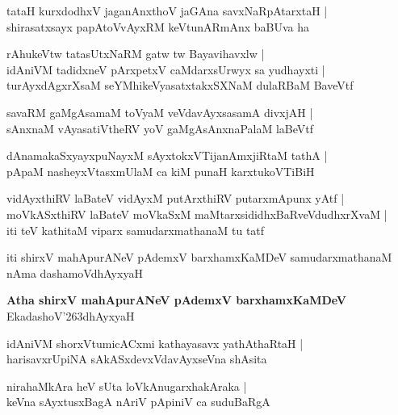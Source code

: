 \begin{shloka}
tataH kurxdodhxV jaganAnxthoV jaGAna savxNaRpAtarxtaH |\\
shirasatxsayx papAtoVvAyxRM keVtunARmAnx baBUva ha
\end{shloka}

\begin{shloka}
rAhukeVtw tatasUtxNaRM gatw tw Bayavihavxlw |\\
idAniVM tadidxneV pArxpetxV caMdarxsUrwyx sa yudhayxti |\\
turAyxdAgxrXsaM seYMhikeVyasatxtakxSXNaM dulaRBaM BaveVtf
\end{shloka}

\begin{shloka}
savaRM gaMgAsamaM toVyaM veVdavAyxsasamA divxjAH |\\
sAnxnaM vAyasatiVtheRV yoV gaMgAsAnxnaPalaM laBeVtf
\end{shloka}

\begin{shloka}
dAnamakaSxyayxpuNayxM sAyxtokxVTijanAmxjiRtaM tathA |\\
pApaM nasheyxVtasxmUlaM ca kiM punaH karxtukoVTiBiH
\end{shloka}

\begin{shloka}
vidAyxthiRV laBateV vidAyxM putArxthiRV putarxmApunx yAtf |\\
moVkASxthiRV laBateV moVkaSxM maMtarxsididhxBaRveVdudhxrXvaM |\\
iti teV kathitaM viparx samudarxmathanaM tu tatf
\end{shloka}
iti shirxV mahApurANeV pAdemxV barxhamxKaMDeV samudarxmathanaM nAma dashamoVdhAyxyaH

\begin{center}
\textbf{\large Atha shirxV mahApurANeV pAdemxV barxhamxKaMDeV}\\
EkadashoV\char'263dhAyxyaH
\end{center}

\setcounter{shloka}{0}
\begin{shloka}
idAniVM shorxVtumicACxmi kathayasavx yathAthaRtaH |\\
harisavxrUpiNA sAkASxdevxVdavAyxseVna shAsita
\end{shloka}

\begin{shloka}
nirahaMkAra heV sUta loVkAnugarxhakAraka |\\
keVna sAyxtusxBagA nAriV pApiniV ca suduBaRgA
\end{shloka}

